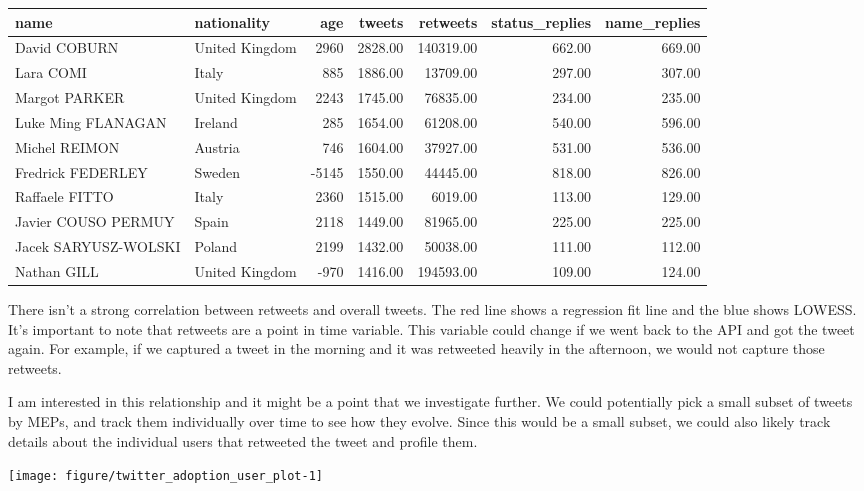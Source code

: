 \documentclass{article}\usepackage[]{graphicx}\usepackage[]{color}
\makeatletter
\def\maxwidth{ %
  \ifdim\Gin@nat@width>\linewidth
    \linewidth
  \else
    \Gin@nat@width
  \fi
}
\newenvironment{knitrout}{}{} %
\makeatother
\begin{document}
\begin{tabular}{llrrrrr}
  \hline
name & nationality & age & tweets & retweets & status\_replies & name\_replies \\ 
  \hline
David COBURN & United Kingdom & 2960 & 2828.00 & 140319.00 & 662.00 & 669.00 \\ 
  Lara COMI & Italy & 885 & 1886.00 & 13709.00 & 297.00 & 307.00 \\ 
  Margot PARKER & United Kingdom & 2243 & 1745.00 & 76835.00 & 234.00 & 235.00 \\ 
  Luke Ming FLANAGAN & Ireland & 285 & 1654.00 & 61208.00 & 540.00 & 596.00 \\ 
  Michel REIMON & Austria & 746 & 1604.00 & 37927.00 & 531.00 & 536.00 \\ 
  Fredrick FEDERLEY & Sweden & -5145 & 1550.00 & 44445.00 & 818.00 & 826.00 \\ 
  Raffaele FITTO & Italy & 2360 & 1515.00 & 6019.00 & 113.00 & 129.00 \\ 
  Javier COUSO PERMUY & Spain & 2118 & 1449.00 & 81965.00 & 225.00 & 225.00 \\ 
  Jacek SARYUSZ-WOLSKI & Poland & 2199 & 1432.00 & 50038.00 & 111.00 & 112.00 \\ 
  Nathan GILL & United Kingdom & -970 & 1416.00 & 194593.00 & 109.00 & 124.00 \\ 
   \hline
\end{tabular}




There isn't a strong correlation between retweets and overall tweets. The red line shows a regression fit line and the blue shows LOWESS. It's important to note that retweets are a point in time variable. This variable could change if we went back to the API and got the tweet again. For example, if we captured a tweet in the morning and it was retweeted heavily in the afternoon, we would not capture those retweets.

I am interested in this relationship and it might be a point that we investigate further. We could potentially pick a small subset of tweets by MEPs, and track them individually over time to see how they evolve. Since this would be a small subset, we could also likely track details about the individual users that retweeted the tweet and profile them.

\begin{knitrout}
\color{fgcolor}

{\centering \texttt{[image: figure/twitter\_adoption\_user\_plot-1]} 

}



\end{knitrout}
\end{document}
